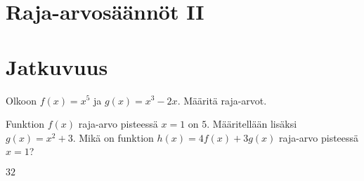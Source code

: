 \section{Raja-arvosäännöt II}


\section{Jatkuvuus}

\begin{tehtavasivu}


\begin{tehtava}
	Olkoon $f(x)=x^5$ ja $g(x)=x^3-2x$. Määritä raja-arvot.
	\begin{alakohdat}
	\end{alakohdat}
	\begin{vastaus}
		\begin{alakohdat}
			\alakohta{$32$}
			\alakohta{$4$}
			\alakohta{$36$}
			\alakohta{$128$}
		\end{alakohdat}
	\end{vastaus}
\end{tehtava}

\begin{tehtava}
	Funktion $f(x)$ raja-arvo pisteessä $x=1$ on $5$. Määritellään lisäksi $g(x) = x^2+3$. Mikä on funktion $h(x) = 4f(x) + 3g(x)$ raja-arvo pisteessä $x=1$?
	\begin{vastaus}
		$32$
	\end{vastaus}
\end{tehtava}

\end{tehtavasivu}

